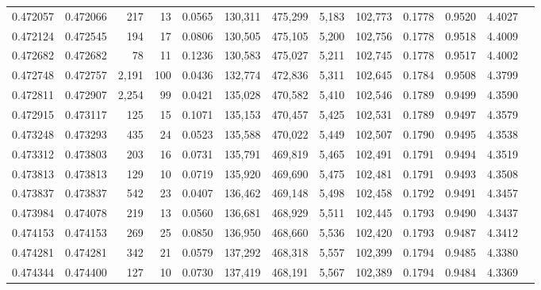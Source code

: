 \begin{tabular}{rrrrrrrrrrrrr}
0.472057 & 0.472066 &   217 &    13 &                                     0.0565 & 130,311 & 475,299 &   5,183 & 102,773 & 0.1778 & 0.9520 & 4.4027 \\
0.472124 & 0.472545 &   194 &    17 &                                     0.0806 & 130,505 & 475,105 &   5,200 & 102,756 & 0.1778 & 0.9518 & 4.4009 \\
0.472682 & 0.472682 &    78 &    11 &                                     0.1236 & 130,583 & 475,027 &   5,211 & 102,745 & 0.1778 & 0.9517 & 4.4002 \\
0.472748 & 0.472757 & 2,191 &   100 &                                     0.0436 & 132,774 & 472,836 &   5,311 & 102,645 & 0.1784 & 0.9508 & 4.3799 \\
0.472811 & 0.472907 & 2,254 &    99 &                                     0.0421 & 135,028 & 470,582 &   5,410 & 102,546 & 0.1789 & 0.9499 & 4.3590 \\
0.472915 & 0.473117 &   125 &    15 &                                     0.1071 & 135,153 & 470,457 &   5,425 & 102,531 & 0.1789 & 0.9497 & 4.3579 \\
0.473248 & 0.473293 &   435 &    24 &                                     0.0523 & 135,588 & 470,022 &   5,449 & 102,507 & 0.1790 & 0.9495 & 4.3538 \\
0.473312 & 0.473803 &   203 &    16 &                                     0.0731 & 135,791 & 469,819 &   5,465 & 102,491 & 0.1791 & 0.9494 & 4.3519 \\
0.473813 & 0.473813 &   129 &    10 &                                     0.0719 & 135,920 & 469,690 &   5,475 & 102,481 & 0.1791 & 0.9493 & 4.3508 \\
0.473837 & 0.473837 &   542 &    23 &                                     0.0407 & 136,462 & 469,148 &   5,498 & 102,458 & 0.1792 & 0.9491 & 4.3457 \\
0.473984 & 0.474078 &   219 &    13 &                                     0.0560 & 136,681 & 468,929 &   5,511 & 102,445 & 0.1793 & 0.9490 & 4.3437 \\
0.474153 & 0.474153 &   269 &    25 &                                     0.0850 & 136,950 & 468,660 &   5,536 & 102,420 & 0.1793 & 0.9487 & 4.3412 \\
0.474281 & 0.474281 &   342 &    21 &                                     0.0579 & 137,292 & 468,318 &   5,557 & 102,399 & 0.1794 & 0.9485 & 4.3380 \\
0.474344 & 0.474400 &   127 &    10 &                                     0.0730 & 137,419 & 468,191 &   5,567 & 102,389 & 0.1794 & 0.9484 & 4.3369 \\

\end{tabular}
